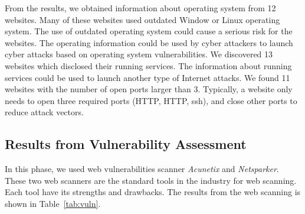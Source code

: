 \documentclass[conference]{IEEEtran}
\begin{document}
From the results, we obtained information about operating system from 12 websites. Many of these websites used outdated Window or Linux operating system. The use of outdated operating system could cause a serious risk for the websites. The operating information could be used by cyber attackers to launch cyber attacks based on operating system vulnerabilities. We discovered 13 websites which disclosed their running services. The information about running services could be used to launch another type of Internet attacks. We found 11 websites with the number of open ports larger than 3. Typically, a website only needs to open three required ports (HTTP, HTTP, ssh), and close other ports to reduce attack vectors.

\subsection{Results from Vulnerability Assessment}

In this phase, we used web vulnerabilities scanner \emph{Acunetix} and \emph{Netsparker}. These two web scanners are the standard tools in the industry for web scanning. Each tool have its strengths and drawbacks. The results from the web scanning is shown in Table~\ref{tab:vuln}.


\end{document}
